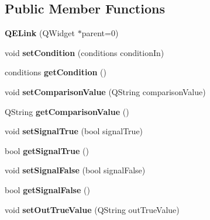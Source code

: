 \subsection*{Public Member Functions}
\begin{DoxyCompactItemize}
\item 
\hypertarget{classQELink_a56ae044b914e04a190c0237444c25647}{
{\bfseries QELink} (QWidget $\ast$parent=0)}
\label{classQELink_a56ae044b914e04a190c0237444c25647}

\item 
\hypertarget{classQELink_a498f2e13f229635aa336564de59c2b98}{
void {\bfseries setCondition} (conditions conditionIn)}
\label{classQELink_a498f2e13f229635aa336564de59c2b98}

\item 
\hypertarget{classQELink_a1511bf385fd4dcf16eb9eae84f271ebc}{
conditions {\bfseries getCondition} ()}
\label{classQELink_a1511bf385fd4dcf16eb9eae84f271ebc}

\item 
\hypertarget{classQELink_aa9972a078979919b7f4318f98f35b48a}{
void {\bfseries setComparisonValue} (QString comparisonValue)}
\label{classQELink_aa9972a078979919b7f4318f98f35b48a}

\item 
\hypertarget{classQELink_a3fff45bbdbfb47515acbaff93787c80c}{
QString {\bfseries getComparisonValue} ()}
\label{classQELink_a3fff45bbdbfb47515acbaff93787c80c}

\item 
\hypertarget{classQELink_a6d14898770aeffb90d467a00098642ea}{
void {\bfseries setSignalTrue} (bool signalTrue)}
\label{classQELink_a6d14898770aeffb90d467a00098642ea}

\item 
\hypertarget{classQELink_a3966ea0fc0445fec9a482ad2322dabd4}{
bool {\bfseries getSignalTrue} ()}
\label{classQELink_a3966ea0fc0445fec9a482ad2322dabd4}

\item 
\hypertarget{classQELink_a7074b2d0ec3bfddaec6ed8265278c6dc}{
void {\bfseries setSignalFalse} (bool signalFalse)}
\label{classQELink_a7074b2d0ec3bfddaec6ed8265278c6dc}

\item 
\hypertarget{classQELink_a0856b8b6f754c9847a0da8aa1139ef52}{
bool {\bfseries getSignalFalse} ()}
\label{classQELink_a0856b8b6f754c9847a0da8aa1139ef52}

\item 
\hypertarget{classQELink_a83e2b8e30c0f7fca3b1d7acb82c65d21}{
void {\bfseries setOutTrueValue} (QString outTrueValue)}
\label{classQELink_a83e2b8e30c0f7fca3b1d7acb82c65d21}


\end{DoxyCompactItemize}
